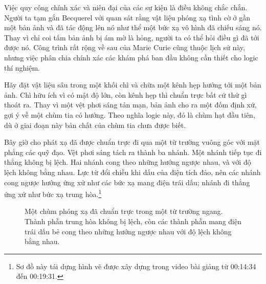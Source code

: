 Việc quy công chính xác và niên đại của các sự kiện là điều không chắc chắn. Người ta tạm gắn Becquerel với quan sát rằng vật liệu phóng xạ tình cờ ở gần một bản ảnh và đã tác động lên nó như thể một bức xạ vô hình đã chiếu sáng nó. Thay vì chỉ coi tấm bản ảnh bị ám mờ là hỏng, người ta có thể hỏi điều gì đã tới được nó. Công trình rất rộng về sau của Marie Curie cũng thuộc lịch sử này, nhưng việc phân chia chính xác các khám phá ban đầu không cần thiết cho logic thí nghiệm.

Hãy đặt vật liệu sâu trong một khối chì và chừa một kênh hẹp hướng tới một bản ảnh. Chì hữu ích vì có mật độ lớn, còn kênh hẹp thì chuẩn trực bất cứ thứ gì thoát ra. Thay vì một vệt phơi sáng tản mạn, bản ảnh cho ra một đốm định xứ, gợi ý về một chùm tia có hướng. Theo nghĩa logic này, đó là chùm hạt đầu tiên, dù ở giai đoạn này bản chất của chùm tia chưa được biết.

Bây giờ cho phát xạ đã được chuẩn trực đi qua một từ trường vuông góc với mặt phẳng các quỹ đạo. Vệt phơi sáng tách ra thành ba nhánh. Một nhánh tiếp tục đi thẳng không bị lệch. Hai nhánh cong theo những hướng ngược nhau, và với độ lệch không bằng nhau. Lực từ đổi chiều khi dấu của điện tích đảo, nên các nhánh cong ngược hướng ứng xử như các bức xạ mang điện trái dấu; nhánh đi thẳng ứng xử như bức xạ trung hòa.\footnote{Sơ đồ này tái dựng hình vẽ được xây dựng trong video bài giảng từ 00:14:34 đến 00:19:31.}

\begin{figure}[h]
\centering
{}
\caption{Một chùm phóng xạ đã chuẩn trực trong một từ trường ngang. Thành phần trung hòa không bị lệch, còn các thành phần mang điện trái dấu bẻ cong theo những hướng ngược nhau với độ lệch không bằng nhau.}
\end{figure}


